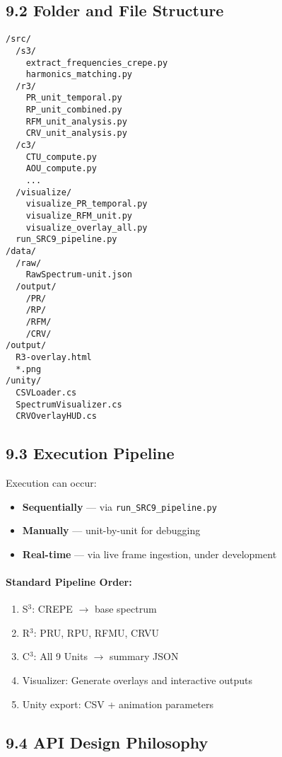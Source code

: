 \subsection*{9.2 Folder and File Structure}

\begin{verbatim}
/src/
  /s3/
    extract_frequencies_crepe.py
    harmonics_matching.py
  /r3/
    PR_unit_temporal.py
    RP_unit_combined.py
    RFM_unit_analysis.py
    CRV_unit_analysis.py
  /c3/
    CTU_compute.py
    AOU_compute.py
    ...
  /visualize/
    visualize_PR_temporal.py
    visualize_RFM_unit.py
    visualize_overlay_all.py
  run_SRC9_pipeline.py
/data/
  /raw/
    RawSpectrum-unit.json
  /output/
    /PR/
    /RP/
    /RFM/
    /CRV/
/output/
  R3-overlay.html
  *.png
/unity/
  CSVLoader.cs
  SpectrumVisualizer.cs
  CRVOverlayHUD.cs
\end{verbatim}

\subsection*{9.3 Execution Pipeline}

Execution can occur:

\begin{itemize}
    \item \textbf{Sequentially} — via \texttt{run_SRC9_pipeline.py}
    \item \textbf{Manually} — unit-by-unit for debugging
    \item \textbf{Real-time} — via live frame ingestion, under development
\end{itemize}

\paragraph{Standard Pipeline Order:}

\begin{enumerate}
    \item S$^3$: CREPE $\rightarrow$ base spectrum
    \item R$^3$: PRU, RPU, RFMU, CRVU
    \item C$^3$: All 9 Units $\rightarrow$ summary JSON
    \item Visualizer: Generate overlays and interactive outputs
    \item Unity export: CSV + animation parameters
\end{enumerate}

\subsection*{9.4 API Design Philosophy}

